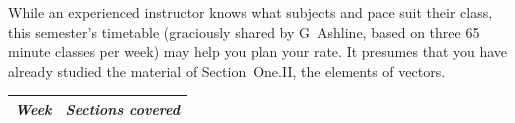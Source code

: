 {While an experienced instructor knows what subjects and
pace suit their class, this semester's timetable 
(graciously shared by G~Ashline, based on three 65 minute classes per week)
may help you plan your rate.
It presumes that you have already studied the material of 
Section~One.II, the elements of vectors.
\begin{center} 
   \begin{tabular}{r|l}
      \multicolumn{1}{r}{\textit{Week}}  
       &\textit{Sections covered}        \\ \hline

\end{tabular}
\end{center}}
